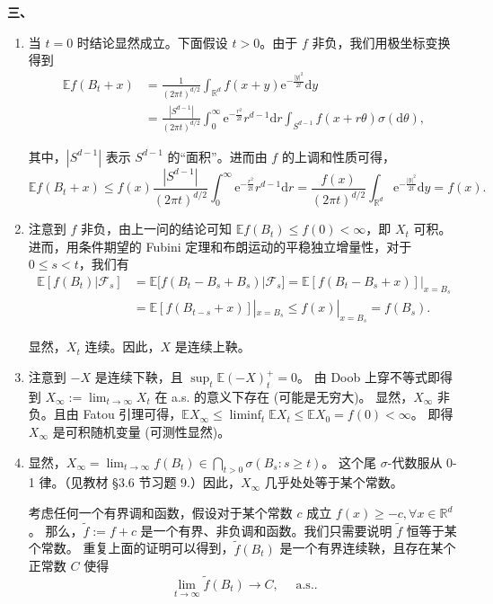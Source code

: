     \textbf{三、}
    \begin{enumerate}[label=(\arabic*)]
    \item 当 $t=0$ 时结论显然成立。下面假设 $t>0$。由于 $f$ 非负，我们用极坐标变换得到
    \begin{align*}
    \mathbb{E} f(B_{t}+x) & =\frac{1}{(2 \pi t)^{d/2}} \int_{\mathbb{R}^{d}} f(x+y) \mathrm{e}^{-\frac{|y|^{2}}{2t}} \mathrm{d} y \\
    & =\frac{\left|S^{d-1}\right|}{(2 \pi t)^{d/2}} \int_{0}^{\infty} \mathrm{e}^{-\frac{r^{2}}{2t}} r^{d-1} \mathrm{d} r \int_{S^{d-1}} f(x+r \theta) \sigma(\mathrm{d} \theta),
    \end{align*}

    其中，$\left|S^{d-1}\right|$ 表示 $S^{d-1}$ 的``面积''。进而由 $f$ 的上调和性质可得，
    $$\mathbb{E} f(B_{t}+x) \leq f(x) \frac{\left|S^{d-1}\right|}{(2 \pi t)^{d/2}} \int_{0}^{\infty} \mathrm{e}^{-\frac{r^{2}}{2t}} r^{d-1} \mathrm{d} r
    =\frac{f(x)}{(2 \pi t)^{d/2}} \int_{\mathbb{R}^{d}} \mathrm{e}^{-\frac{|y|^{2}}{2t}} \mathrm{d} y=f(x).$$
    \item 注意到 $f$ 非负，由上一问的结论可知 $\mathbb{E} f(B_{t}) \leq f(0)<\infty$，即 $X_{t}$ 可积。
    进而，用条件期望的 Fubini 定理和布朗运动的平稳独立增量性，对于 $0 \leq s<t$，我们有
    \begin{align*}
    \mathbb{E}[f(B_{t}) | \mathscr{F}_{s}] & =\mathbb{E}[f(B_{t}-B_{s}+B_{s}) | \mathscr{F}_{s}]=\mathbb{E}[f(B_{t}-B_{s}+x)]|_{x=B_{s}} \\
    & =\mathbb{E}[f(B_{t-s}+x)]|_{x=B_{s}} \leq f(x)|_{x=B_{s}}=f(B_{s}).
    \end{align*}

    显然，$X_{t}$ 连续。因此，$X$ 是连续上鞅。

    \item 注意到 $-X$ 是连续下鞅，且 $\sup _{t} \mathbb{E}(-X)_{t}^{+}=0$。
    由 Doob 上穿不等式即得到 $X_{\infty}:=\lim_{t \rightarrow \infty} X_{t}$ 在 a.s. 的意义下存在 (可能是无穷大)。
    显然，$X_{\infty}$ 非负。且由 Fatou 引理可得，$\mathbb{E} X_{\infty} \leq \liminf_{t} \mathbb{E} X_{t} \leq \mathbb{E} X_{0}=f(0)<\infty$。
    即得 $X_{\infty}$ 是可积随机变量 (可测性显然)。

    \item 显然，$X_{\infty}=\lim_{t \rightarrow \infty} f(B_{t}) \in \bigcap_{t>0} \sigma(B_{s}: s \geq t)$。
    这个尾 $\sigma$-代数服从 0-1 律。（见教材 §3.6 节习题 9.）因此，$X_{\infty}$ 几乎处处等于某个常数。

    考虑任何一个有界调和函数，假设对于某个常数 $c$ 成立 $f(x) \geq-c, \forall x \in \mathbb{R}^{d}$。
    那么，$\tilde{f}:=f+c$ 是一个有界、非负调和函数。我们只需要说明 $\tilde{f}$ 恒等于某个常数。
    重复上面的证明可以得到，$\tilde{f}(B_{t})$ 是一个有界连续鞅，且存在某个正常数 $C$ 使得
    $$\lim_{t \rightarrow \infty} \tilde{f}(B_{t}) \rightarrow C, \quad \text { a.s.}.$$


\end{enumerate}
